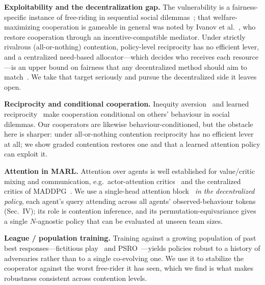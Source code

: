 \documentclass[conference, a4paper]{IEEEtran}
\begin{document}
\textbf{Exploitability and the decentralization gap.} The vulnerability is a
fairness-specific instance of free-riding in sequential social
dilemmas~\cite{leibo2017ssd}; that welfare-maximizing cooperation is gameable in
general was noted by Ivanov et al.~\cite{ivanov2023mediated}, who restore
cooperation through an incentive-compatible mediator. Under strictly rivalrous
(all-or-nothing) contention, policy-level reciprocity has no efficient lever, and a
centralized need-based allocator---which decides who receives each resource---is an
upper bound on fairness that any decentralized method should aim to
match~\cite{savci2026exploit}. We take that target seriously and pursue the
decentralized side it leaves open.

\textbf{Reciprocity and conditional cooperation.} Inequity
aversion~\cite{hughes2018inequity} and learned
reciprocity~\cite{eccles2019reciprocity} make cooperation conditional on others'
behaviour in social dilemmas. Our cooperators are likewise behaviour-conditioned,
but the obstacle here is sharper: under all-or-nothing contention reciprocity has
no efficient lever at all; we show graded contention restores one and that a
learned attention policy can exploit it.

\textbf{Attention in MARL.} Attention over agents is well established for
value/critic mixing and communication, e.g.\ actor-attention
critics~\cite{iqbal2019maac} and the centralized critics of
MADDPG~\cite{lowe2017maddpg}. We use a single-head attention
block~\cite{vaswani2017attention} \emph{in the decentralized policy}, each agent's
query attending across all agents' observed-behaviour tokens (Sec.~IV); its role is
contention inference, and its
permutation-equivariance gives a single $N$-agnostic policy that can be evaluated at
unseen team sizes.

\textbf{League / population training.} Training against a growing population of
past best responses---fictitious play~\cite{heinrich2015fsp} and
PSRO~\cite{lanctot2017psro}---yields policies robust to a history of adversaries
rather than to a single co-evolving one. We use it to stabilize the cooperator
against the worst free-rider it has seen, which we find is what makes robustness
consistent across contention levels.
\end{document}
